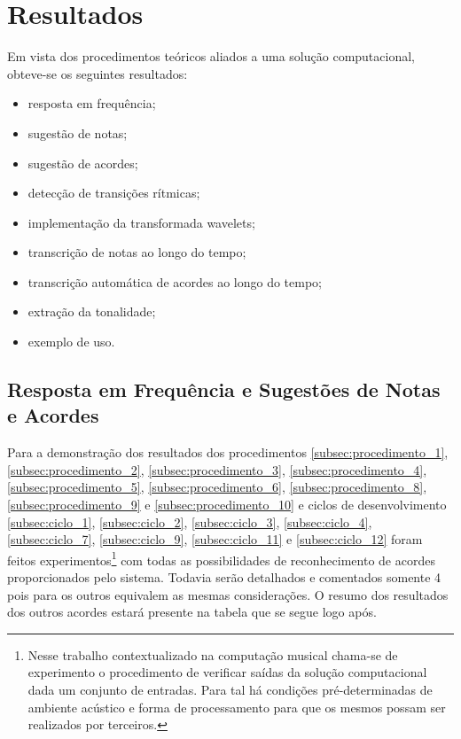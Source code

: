 \chapter{Resultados}
\label{chap:resultados}

Em vista dos procedimentos teóricos aliados a uma solução computacional, obteve-se os seguintes resultados:
\begin{itemize}
    \item resposta em frequência;
    \item sugestão de notas;
    \item sugestão de acordes;
    \item detecção de transições rítmicas;
    \item implementação da transformada wavelets;
    \item transcrição de notas ao longo do tempo;
    \item transcrição automática de acordes ao longo do tempo;
    \item extração da tonalidade;
    \item exemplo de uso.
\end{itemize}


\section{Resposta em Frequência e Sugestões de Notas e Acordes}
\label{sec:resposta}

Para a demonstração dos resultados dos procedimentos \ref{subsec:procedimento_1}, \ref{subsec:procedimento_2}, \ref{subsec:procedimento_3}, \ref{subsec:procedimento_4}, \ref{subsec:procedimento_5}, \ref{subsec:procedimento_6}, \ref{subsec:procedimento_8}, \ref{subsec:procedimento_9} e \ref{subsec:procedimento_10} e ciclos de desenvolvimento \ref{subsec:ciclo_1}, \ref{subsec:ciclo_2}, \ref{subsec:ciclo_3}, \ref{subsec:ciclo_4}, \ref{subsec:ciclo_7}, \ref{subsec:ciclo_9}, \ref{subsec:ciclo_11} e \ref{subsec:ciclo_12} foram feitos experimentos\footnote{Nesse trabalho contextualizado na computação musical chama-se de experimento o procedimento de verificar saídas da solução computacional dada um conjunto de entradas. Para tal há condições pré-determinadas de ambiente acústico e forma de processamento para que os mesmos possam ser realizados por terceiros.} com todas as possibilidades de reconhecimento de acordes proporcionados pelo sistema. Todavia serão detalhados e comentados somente 4 pois para os outros equivalem as mesmas considerações. O resumo dos resultados dos outros acordes estará presente na tabela que se segue logo após.


